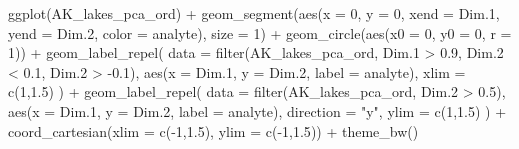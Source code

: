 \documentclass[
]{krantz}
\newenvironment{Shaded}{\begin{snugshade}}{\end{snugshade}}
\newcommand{\AttributeTok}[1]{\textcolor[rgb]{0.77,0.63,0.00}{#1}}
\newcommand{\DecValTok}[1]{\textcolor[rgb]{0.00,0.00,0.81}{#1}}
\newcommand{\FloatTok}[1]{\textcolor[rgb]{0.00,0.00,0.81}{#1}}
\newcommand{\FunctionTok}[1]{\textcolor[rgb]{0.00,0.00,0.00}{#1}}
\newcommand{\NormalTok}[1]{#1}
\newcommand{\SpecialCharTok}[1]{\textcolor[rgb]{0.00,0.00,0.00}{#1}}
\newcommand{\StringTok}[1]{\textcolor[rgb]{0.31,0.60,0.02}{#1}}
\begin{document}
\begin{Shaded}
\begin{Highlighting}[]
\FunctionTok{ggplot}\NormalTok{(AK\_lakes\_pca\_ord) }\SpecialCharTok{+}
  \FunctionTok{geom\_segment}\NormalTok{(}\FunctionTok{aes}\NormalTok{(}\AttributeTok{x =} \DecValTok{0}\NormalTok{, }\AttributeTok{y =} \DecValTok{0}\NormalTok{, }\AttributeTok{xend =}\NormalTok{ Dim}\FloatTok{.1}\NormalTok{, }\AttributeTok{yend =}\NormalTok{ Dim}\FloatTok{.2}\NormalTok{, }\AttributeTok{color =}\NormalTok{ analyte), }\AttributeTok{size =} \DecValTok{1}\NormalTok{) }\SpecialCharTok{+}
  \FunctionTok{geom\_circle}\NormalTok{(}\FunctionTok{aes}\NormalTok{(}\AttributeTok{x0 =} \DecValTok{0}\NormalTok{, }\AttributeTok{y0 =} \DecValTok{0}\NormalTok{, }\AttributeTok{r =} \DecValTok{1}\NormalTok{)) }\SpecialCharTok{+}
  \FunctionTok{geom\_label\_repel}\NormalTok{(}
    \AttributeTok{data =} \FunctionTok{filter}\NormalTok{(AK\_lakes\_pca\_ord, Dim}\FloatTok{.1} \SpecialCharTok{\textgreater{}} \FloatTok{0.9}\NormalTok{, Dim}\FloatTok{.2} \SpecialCharTok{\textless{}} \FloatTok{0.1}\NormalTok{, Dim}\FloatTok{.2} \SpecialCharTok{\textgreater{}} \SpecialCharTok{{-}}\FloatTok{0.1}\NormalTok{),}
    \FunctionTok{aes}\NormalTok{(}\AttributeTok{x =}\NormalTok{ Dim}\FloatTok{.1}\NormalTok{, }\AttributeTok{y =}\NormalTok{ Dim}\FloatTok{.2}\NormalTok{, }\AttributeTok{label =}\NormalTok{ analyte), }\AttributeTok{xlim =} \FunctionTok{c}\NormalTok{(}\DecValTok{1}\NormalTok{,}\FloatTok{1.5}\NormalTok{)}
\NormalTok{  ) }\SpecialCharTok{+}
  \FunctionTok{geom\_label\_repel}\NormalTok{(}
    \AttributeTok{data =} \FunctionTok{filter}\NormalTok{(AK\_lakes\_pca\_ord, Dim}\FloatTok{.2} \SpecialCharTok{\textgreater{}} \FloatTok{0.5}\NormalTok{),}
    \FunctionTok{aes}\NormalTok{(}\AttributeTok{x =}\NormalTok{ Dim}\FloatTok{.1}\NormalTok{, }\AttributeTok{y =}\NormalTok{ Dim}\FloatTok{.2}\NormalTok{, }\AttributeTok{label =}\NormalTok{ analyte), }\AttributeTok{direction =} \StringTok{"y"}\NormalTok{, }\AttributeTok{ylim =} \FunctionTok{c}\NormalTok{(}\DecValTok{1}\NormalTok{,}\FloatTok{1.5}\NormalTok{)}
\NormalTok{  ) }\SpecialCharTok{+}
  \FunctionTok{coord\_cartesian}\NormalTok{(}\AttributeTok{xlim =} \FunctionTok{c}\NormalTok{(}\SpecialCharTok{{-}}\DecValTok{1}\NormalTok{,}\FloatTok{1.5}\NormalTok{), }\AttributeTok{ylim =} \FunctionTok{c}\NormalTok{(}\SpecialCharTok{{-}}\DecValTok{1}\NormalTok{,}\FloatTok{1.5}\NormalTok{)) }\SpecialCharTok{+}
  \FunctionTok{theme\_bw}\NormalTok{()}
\end{Highlighting}
\end{Shaded}
\end{document}
